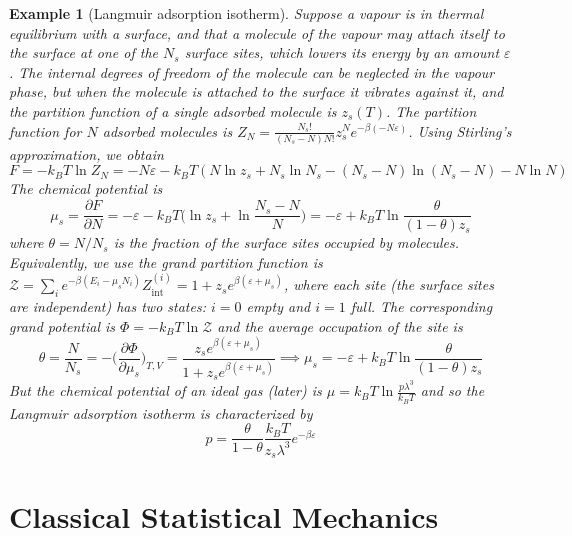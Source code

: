 \documentclass[a4paper]{article}
\newtheorem{eg}{Example}[section]
\theoremstyle{new}
\begin{document}
\begin{eg}[Langmuir adsorption isotherm]
Suppose a vapour is in thermal equilibrium with a surface, and that a molecule of the vapour may attach itself to the surface at one of the $N_s$ surface sites, which lowers its energy by an amount $\varepsilon$. The internal degrees of freedom of the molecule can be neglected in the vapour phase, but when the molecule is attached to the surface it vibrates against it, and the partition function of a single adsorbed molecule is $z_s(T)$. The partition function for $N$ adsorbed molecules is $Z_N=\frac{N_s!}{(N_s-N)N!}z_s^Ne^{-\beta(-N\varepsilon)}$. Using Stirling's approximation, we obtain
$$F=-k_BT\ln Z_N=-N\varepsilon-k_BT(N\ln z_s+N_s\ln N_s-(N_s-N)\ln(N_s-N)-N\ln N)$$
The chemical potential is
$$\mu_s=\frac{\partial F}{\partial N}=-\varepsilon-k_BT\bigg(\ln z_s+\ln\frac{N_s-N}{N}\bigg)=-\varepsilon+k_BT\ln\frac{\theta}{(1-\theta)z_s}$$
where $\theta=N/N_s$ is the fraction of the surface sites occupied by molecules. Equivalently, we use the grand partition function is $\mathcal{Z}=\sum_ie^{-\beta(E_i-\mu_sN_i)}Z_{\text{int}}^{(i)}=1+z_se^{\beta(\varepsilon+\mu_s)}$, where each site (the surface sites are independent) has two states: $i=0$ empty and $i=1$ full. The corresponding grand potential is $\Phi=-k_BT\ln\mathcal{Z}$ and the average occupation of the site is
$$\theta=\frac{N}{N_s}=-\bigg(\frac{\partial\Phi}{\partial\mu_s}\bigg)_{T,V}=\frac{z_se^{\beta(\varepsilon+\mu_s)}}{1+z_se^{\beta(\varepsilon+\mu_s)}}\implies\mu_s=-\varepsilon+k_BT\ln\frac{\theta}{(1-\theta)z_s}$$
But the chemical potential of an ideal gas (later) is $\mu=k_BT\ln\frac{p\lambda^3}{k_BT}$ and so the Langmuir adsorption isotherm is characterized by
$$p=\frac{\theta}{1-\theta}\frac{k_BT}{z_s\lambda^3}e^{-\beta\varepsilon}$$
\end{eg}
\newpage
\section{Classical Statistical Mechanics}
\end{document}
